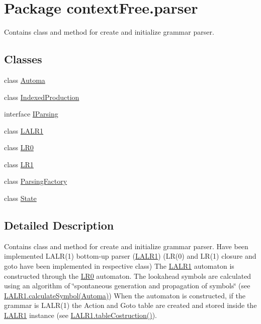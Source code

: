 \hypertarget{namespacecontext_free_1_1parser}{\section{Package context\-Free.\-parser}
\label{namespacecontext_free_1_1parser}
}


Contains class and method for create and initialize grammar parser.  


\subsection*{Classes}
\begin{DoxyCompactItemize}
\item 
class \hyperlink{classcontext_free_1_1parser_1_1_automa}{Automa}
\item 
class \hyperlink{classcontext_free_1_1parser_1_1_indexed_production}{Indexed\-Production}
\item 
interface \hyperlink{interfacecontext_free_1_1parser_1_1_i_parsing}{I\-Parsing}
\item 
class \hyperlink{classcontext_free_1_1parser_1_1_l_a_l_r1}{L\-A\-L\-R1}
\item 
class \hyperlink{classcontext_free_1_1parser_1_1_l_r0}{L\-R0}
\item 
class \hyperlink{classcontext_free_1_1parser_1_1_l_r1}{L\-R1}
\item 
class \hyperlink{classcontext_free_1_1parser_1_1_parsing_factory}{Parsing\-Factory}
\item 
class \hyperlink{classcontext_free_1_1parser_1_1_state}{State}
\end{DoxyCompactItemize}


\subsection{Detailed Description}
Contains class and method for create and initialize grammar parser. Have been implemented L\-A\-L\-R(1) bottom-\/up parser (\hyperlink{classcontext_free_1_1parser_1_1_l_a_l_r1}{L\-A\-L\-R1}) (L\-R(0) and L\-R(1) closure and goto have been implemented in respective class) The \hyperlink{classcontext_free_1_1parser_1_1_l_a_l_r1}{L\-A\-L\-R1} automaton is constructed through the \hyperlink{classcontext_free_1_1parser_1_1_l_r0}{L\-R0} automaton. The lookahead symbols are calculated using an algorithm of \char`\"{}spontaneous generation and propagation of symbols\char`\"{} (see \hyperlink{classcontext_free_1_1parser_1_1_l_a_l_r1_aeec32b5c83e031225114f46ac377f804}{L\-A\-L\-R1.\-calculate\-Symbol(\-Automa)}) When the automaton is constructed, if the grammar is L\-A\-L\-R(1) the Action and Goto table are created and stored inside the \hyperlink{classcontext_free_1_1parser_1_1_l_a_l_r1}{L\-A\-L\-R1} instance (see \hyperlink{classcontext_free_1_1parser_1_1_l_a_l_r1_a79576626b3b59b832faecc986b293b36}{L\-A\-L\-R1.\-table\-Costruction()}).\par


